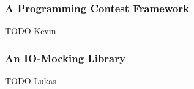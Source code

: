 \subsubsection{A Programming Contest Framework}
TODO Kevin

\subsubsection{An IO-Mocking Library}
TODO Lukas




